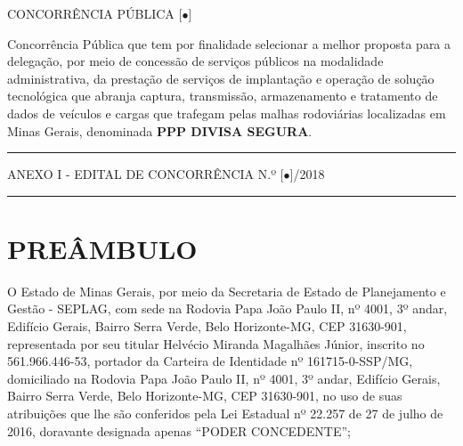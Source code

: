 \documentclass[a4paper,11pt]{report} %
\newcommand{\NumeroLicitacao}{[$\bullet$]}
\newcommand{\Contratante}{Secretaria de Estado de Planejamento e Gestão - SEPLAG}
\newcommand{\ContratanteEndereco}{Rodovia Papa João Paulo II, nº 4001, 3º andar, Edifício Gerais, Bairro Serra Verde, Belo Horizonte-MG, CEP 31630-901}
\newcommand{\RepresentanteContratanteNome}{Helvécio Miranda Magalhães Júnior}
\newcommand{\RepresentanteContratanteCPF}{561.966.446-53}
\newcommand{\RepresentanteContratanteCI}{161715-0-SSP/MG}
\newcommand{\AnexoContratoI}{ANEXO I - EDITAL DE CONCORRÊNCIA N.º \NumeroLicitacao/2018}
\begin{document}

\begin{titlepage}

\vspace*{\fill} %

\begin{flushright}
{\LARGE CONCORRÊNCIA PÚBLICA \NumeroLicitacao} \\ [1.5cm]
\end{flushright}

Concorrência Pública que tem por finalidade selecionar a melhor proposta para a delegação, por meio de concessão de serviços públicos na modalidade administrativa, da prestação de serviços de implantação e operação de solução tecnológica que abranja captura, transmissão, armazenamento e tratamento de dados de veículos e cargas que trafegam pelas malhas rodoviárias localizadas em Minas Gerais, denominada \textbf{PPP DIVISA SEGURA}.

\vspace{1.5\baselineskip}

\hrule

\begin{center}
\AnexoContratoI
\end{center}
\hrule


\end{titlepage}


\renewcommand{\contentsname}{SUMÁRIO}
\tableofcontents
\pagebreak

\setlength\parskip{2ex} %

\chapter*{PREÂMBULO}

O Estado de Minas Gerais, por meio da \Contratante, com sede na \ContratanteEndereco, representada por seu titular \RepresentanteContratanteNome, inscrito no \RepresentanteContratanteCPF, portador da Carteira de Identidade nº \RepresentanteContratanteCI, domiciliado na \ContratanteEndereco, no uso de suas atribuições que lhe são conferidos pela Lei Estadual nº 22.257 de 27 de julho de 2016, doravante designada apenas “PODER CONCEDENTE”;
\end{document}
